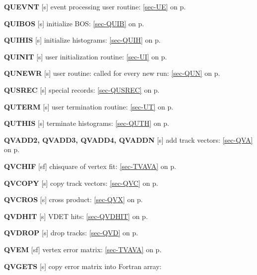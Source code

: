  \item{\bf QUEVNT  }[s] event processing user routine:
 \ref{sec-UE} on p.~\pageref{sec-UE}\\
 \item{\bf QUIBOS  }[s] initialize BOS: \ref{sec-QUIB} on p.~\pageref{sec-QUIB}\\
 \item{\bf QUIHIS  }[s] initialize histograms: \ref{sec-QUIH} on p.~\pageref{sec-QUIH}\\
 \item{\bf QUINIT  }[s] user initialization routine:
 \ref{sec-UI} on p.~\pageref{sec-UI}\\
 \item{\bf QUNEWR  }[s] user routine: called for every new run:
 \ref{sec-QUN} on p.~\pageref{sec-QUN}\\
 \item{\bf QUSREC }[s] special records: \ref{sec-QUSREC} on p.~\pageref{sec-QUSREC}\\
 \item{\bf QUTERM  }[s] user termination routine:
 \ref{sec-UT} on p.~\pageref{sec-UT}\\
 \item{\bf QUTHIS  }[s] terminate histograms: \ref{sec-QUTH} on p.~\pageref{sec-QUTH} \\
 \item{\bf QVADD2, QVADD3, QVADD4, QVADDN}
 [s] add track vectors: \ref{sec-QVA} on p.~\pageref{sec-QVA}\\
 \item{\bf QVCHIF  }[sf] chisquare of vertex fit: \ref{sec-TVAVA} on p.~\pageref{sec-TVAVA}\\
 \item{\bf QVCOPY  }[s] copy track vectors: \ref{sec-QVC} on p.~\pageref{sec-QVC}\\
 \item{\bf QVCROS  }[s] cross product: \ref{sec-QVX} on p.~\pageref{sec-QVX}\\
 \item{\bf QVDHIT  }[s] VDET hits: \ref{sec-QVDHIT} on p.~\pageref{sec-QVDHIT}\\
 \item{\bf QVDROP  }[s] drop tracks: \ref{sec-QVD} on p.~\pageref{sec-QVD}\\
 \item{\bf QVEM    }[sf] vertex error matrix: \ref{sec-TVAVA} on p.~\pageref{sec-TVAVA}\\
 \item{\bf QVGETS  }[s] copy error matrix into Fortran array:
